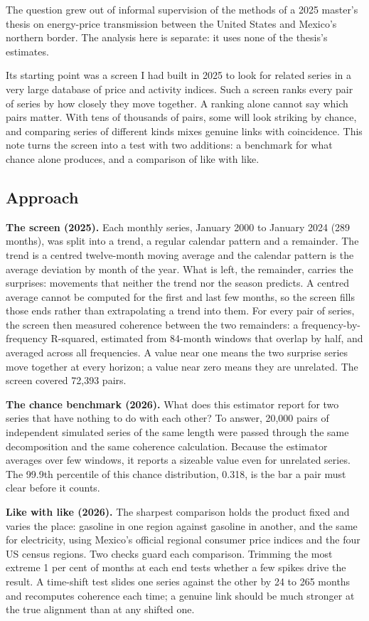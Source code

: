 \documentclass[
  british,
  a4paper,
]{article}
\newcounter{none} %
\begin{document}
The question grew out of informal supervision of the methods of a 2025
master's thesis on energy-price transmission between the United States
and Mexico's northern border. The analysis here is separate: it uses
none of the thesis's estimates.

Its starting point was a screen I had built in 2025 to look for related
series in a very large database of price and activity indices. Such a
screen ranks every pair of series by how closely they move together. A
ranking alone cannot say which pairs matter. With tens of thousands of
pairs, some will look striking by chance, and comparing series of
different kinds mixes genuine links with coincidence. This note turns
the screen into a test with two additions: a benchmark for what chance
alone produces, and a comparison of like with like.

\subsection{Approach}\label{approach}

\textbf{The screen (2025).} Each monthly series, January 2000 to January
2024 (289 months), was split into a trend, a regular calendar pattern
and a remainder. The trend is a centred twelve-month moving average and
the calendar pattern is the average deviation by month of the year. What
is left, the remainder, carries the surprises: movements that neither
the trend nor the season predicts. A centred average cannot be computed
for the first and last few months, so the screen fills those ends rather
than extrapolating a trend into them. For every pair of series, the
screen then measured coherence between the two remainders: a
frequency-by-frequency R-squared, estimated from 84-month windows that
overlap by half, and averaged across all frequencies. A value near one
means the two surprise series move together at every horizon; a value
near zero means they are unrelated. The screen covered 72,393 pairs.

\textbf{The chance benchmark (2026).} What does this estimator report
for two series that have nothing to do with each other? To answer,
20,000 pairs of independent simulated series of the same length were
passed through the same decomposition and the same coherence
calculation. Because the estimator averages over few windows, it reports
a sizeable value even for unrelated series. The 99.9th percentile of
this chance distribution, 0.318, is the bar a pair must clear before it
counts.

\textbf{Like with like (2026).} The sharpest comparison holds the
product fixed and varies the place: gasoline in one region against
gasoline in another, and the same for electricity, using Mexico's
official regional consumer price indices and the four US census regions.
Two checks guard each comparison. Trimming the most extreme 1 per cent
of months at each end tests whether a few spikes drive the result. A
time-shift test slides one series against the other by 24 to 265 months
and recomputes coherence each time; a genuine link should be much
stronger at the true alignment than at any shifted one.
\end{document}
